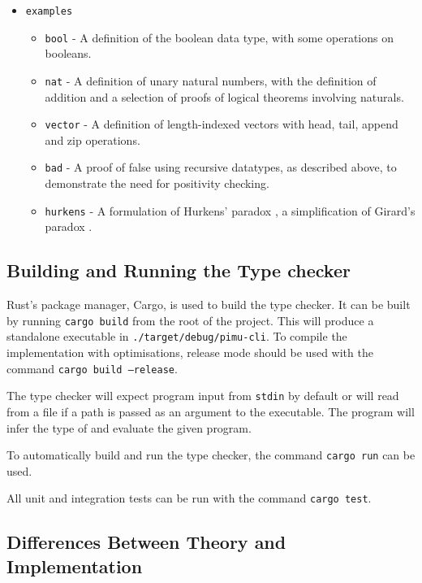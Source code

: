 \documentclass[12pt,a4paper,twoside]{report}
\begin{document}
\begin{itemize}
\begin{itemize}
\begin{itemize}
                    \end{itemize}
          \end{itemize}
    \item \texttt{examples}
        \begin{itemize}
              \item \texttt{bool} - A definition of the boolean data type, with some operations on booleans.
              \item \texttt{nat} - A definition of unary natural numbers, with the definition of addition and a selection of proofs of logical theorems involving naturals.
              \item \texttt{vector} - A definition of length-indexed vectors with head, tail, append and zip operations.
              \item \texttt{bad} - A proof of false using recursive datatypes, as described above, to demonstrate the need for positivity checking.
              \item \texttt{hurkens} - A formulation of Hurkens' paradox \cite{hurkens95}, a simplification of Girard's paradox \cite{girard72}.
          \end{itemize}
\end{itemize}

\subsection{Building and Running the Type checker}

Rust's package manager, Cargo, is used to build the type checker.
It can be built by running \texttt{cargo build} from the root of the project.
This will produce a standalone executable in \texttt{./target/debug/pimu-cli}.
To compile the implementation with optimisations, release mode should be used with the command \texttt{cargo build --release}.

The type checker will expect program input from \texttt{stdin} by default or will read from a file if a path is passed as an argument to the executable.
The program will infer the type of and evaluate the given program.


To automatically build and run the type checker, the command \texttt{cargo run} can be used.

All unit and integration tests can be run with the command \texttt{cargo test}.

\subsection{Differences Between Theory and Implementation}
\end{document}
